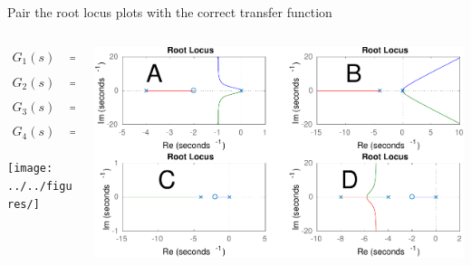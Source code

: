 \documentclass[presentation,aspectratio=169, usenames, dvipsnames]{beamer}
\begin{document}
\begin{frame}[label={sec:org0c242b5}]{Pair the root locus plots with the correct transfer function}
\begin{columns}
\begin{column}{0.3\columnwidth}
\begin{align*}
G_1(s) &= K\frac{s+2}{s(s+4)}\\ G_2(s) &= K\frac{s+2}{s(s+4)(s+8)}\\
G_3(s) &= K\frac{s+2}{s^2(s+4)}\\ G_4(s) &= K \frac{1}{s^2(s+4)}.
\end{align*}

\begin{center}
 \texttt{[image: ../../figures/]}
\end{center}
\end{column}
\begin{column}{0.7\columnwidth}
\begin{center}
\includegraphics[width=1.0\linewidth]{../../figures/rlocus_2x2-crop}
\end{center}
\end{column}
\end{columns}
\end{frame}
\end{document}
